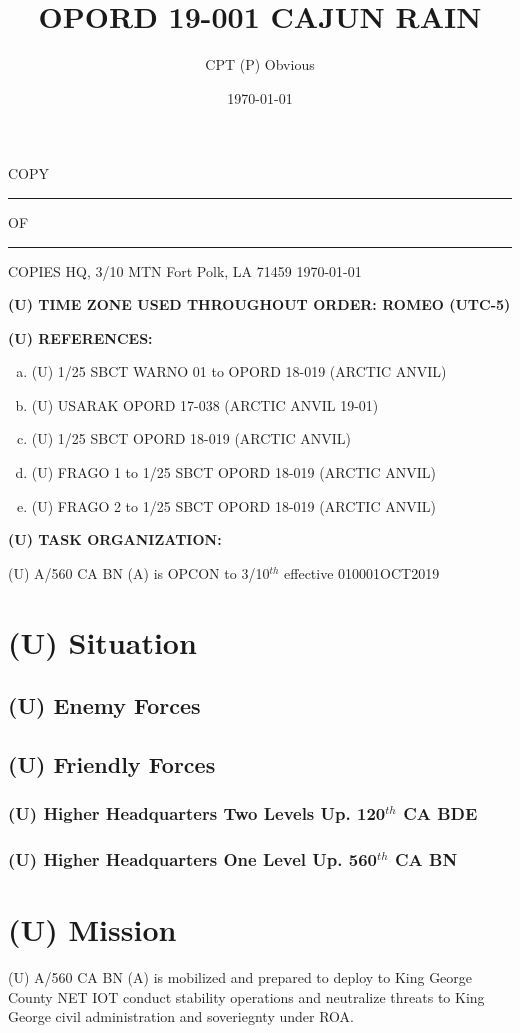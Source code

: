 \documentclass[12pt,letterpaper,notitlepage]{article}
\title{OPORD 19-001 CAJUN RAIN}
\author{CPT (P) Obvious}
\date{\today}
\renewcommand*{\DTMdisplaydate}[4]{%
		\DTMtwodigits{##3} \Milshortmonthname{##2} ##1} %
\newcommand{\Milshortmonthname}[1]{%
	\ifcase#1%
	  \or JAN%
	  \or FEB%
	  \or MAR%
	  \or APR%
	  \or MAY%
	  \or JUN%
	  \or JUL%
	  \or AUG%
	  \or SEP%
	  \or OCT%
	  \or NOV%
	  \or DEC%
	\fi
}
\newcommand{\PM}[1][U]{ {(#1)} }  %
\newcommand{\uptwo}{120$^{th}$ CA BDE}
\newcommand{\upone}{560$^{th}$ CA BN}
\newcommand{\unit}{A/560 CA BN (A)}
\newcommand{\timezone}{ROMEO (UTC-5)}
\begin{document}

\begin{flushright}
COPY \rule{1cm}{0.4pt} OF \rule{1cm}{0.4pt} COPIES \linebreak
HQ, 3/10 MTN \linebreak
Fort Polk, LA 71459 \linebreak
\today
\end{flushright}

\textbf{\PM TIME ZONE USED THROUGHOUT ORDER: \timezone}

\textbf{\PM REFERENCES:}
\begin{enumerate}[(a)]
\item \PM 1/25 SBCT WARNO 01 to OPORD 18-019 (ARCTIC ANVIL)
\item \PM USARAK OPORD 17-038 (ARCTIC ANVIL 19-01)
\item \PM 1/25 SBCT OPORD 18-019 (ARCTIC ANVIL)
\item \PM FRAGO 1 to 1/25 SBCT OPORD 18-019 (ARCTIC ANVIL)
\item \PM FRAGO 2 to 1/25 SBCT OPORD 18-019 (ARCTIC ANVIL)
\end{enumerate}

\textbf{\PM TASK ORGANIZATION:}

\PM \unit{} is OPCON to 3/10$^{th}$ effective 010001OCT2019

\section{\PM Situation}
\subsection{\PM Enemy Forces}
\subsection{\PM Friendly Forces}
\subsubsection{\PM Higher Headquarters Two Levels Up. \uptwo{}}
\subsubsection{\PM Higher Headquarters One Level Up. \upone{}}

\section{\PM Mission}
\PM \unit{}
is mobilized and prepared to deploy 
to King George County
NET 
IOT conduct stability operations and neutralize threats to King George civil
	administration and soveriegnty under ROA.
\end{document}
